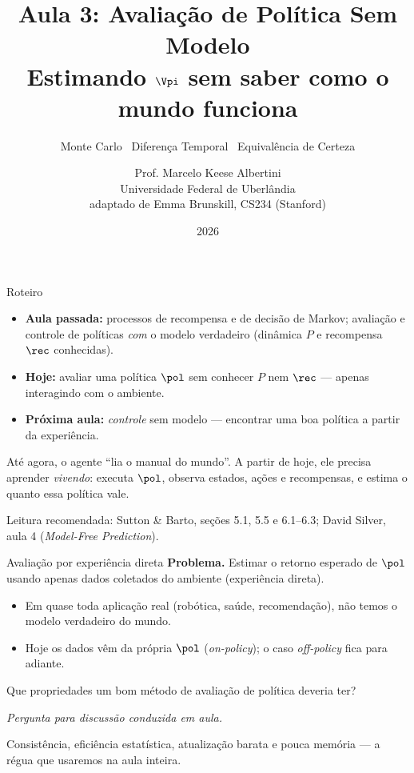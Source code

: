 \documentclass[aspectratio=169, 11pt]{beamer}
\title[Aula 3 — Avaliação sem modelo]{Aula 3: Avaliação de Política Sem Modelo\\
  Estimando $\Vpi$ sem saber como o mundo funciona}
\subtitle[Aprendizagem por Reforço]{Monte Carlo \textbullet\ Diferença Temporal \textbullet\ Equivalência de Certeza}
\author[Prof. Marcelo K. Albertini]{Prof. Marcelo Keese Albertini \\
  \footnotesize Universidade Federal de Uberlândia \\
  \footnotesize adaptado de Emma Brunskill, CS234 (Stanford)}
\institute{Aprendizagem por Reforço}
\date{2026}
\newcommand{\paradiscussao}{\vspace{-0.2em}
  {\footnotesize\color{rlCinza}\itshape Pergunta para discussão conduzida em aula.}}
\begin{document}
\begin{frame}\titlepage\end{frame}

\begin{frame}{Roteiro}
  \begin{itemize}
    \item \textbf{Aula passada:} processos de recompensa e de decisão de Markov;
      avaliação e controle de políticas \emph{com} o modelo verdadeiro
      (dinâmica $P$ e recompensa $\rec$ conhecidas).
    \item \textbf{Hoje:} avaliar uma política $\pol$ \alert{sem} conhecer
      $P$ nem $\rec$ — apenas interagindo com o ambiente.
    \item \textbf{Próxima aula:} \emph{controle} sem modelo — encontrar uma boa
      política a partir da experiência.
  \end{itemize}

  \begin{ideiabox}
    Até agora, o agente ``lia o manual do mundo''. A partir de hoje,
    ele precisa aprender \emph{vivendo}: executa $\pol$, observa estados,
    ações e recompensas, e estima o quanto essa política vale.
  \end{ideiabox}

  \medskip
  {\small\color{rlCinza} Leitura recomendada: Sutton \& Barto,
  seções 5.1, 5.5 e 6.1–6.3; David Silver, aula 4 (\emph{Model-Free Prediction}).}
\end{frame}

\begin{frame}{Avaliação por experiência direta}
  \textbf{Problema.} Estimar o retorno esperado de $\pol$ usando apenas
  dados coletados do ambiente (experiência direta).
  \begin{itemize}\setlength{\itemsep}{0.2ex}
    \item Em quase toda aplicação real (robótica, saúde, recomendação),
      \alert{não temos} o modelo verdadeiro do mundo.
    \item Hoje os dados vêm da própria $\pol$ (\emph{on-policy});
      o caso \emph{off-policy} fica para adiante.
  \end{itemize}

  \begin{quizbox}{}
    Que propriedades um bom método de avaliação de política deveria ter?
  \end{quizbox}
  \paradiscussao

  \pause
  \begin{respbox}
    Consistência, eficiência estatística, atualização barata e pouca
    memória — a régua que usaremos na aula inteira.
  \end{respbox}
\end{frame}
\end{document}
